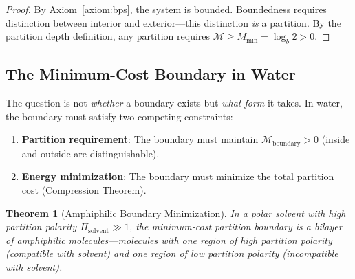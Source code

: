 \documentclass[twocolumn,10pt]{article}
\newtheorem{theorem}{Theorem}[section]
\theoremstyle{remark}
\newcommand{\Depth}{\mathcal{M}}
\newcommand{\Mmin}{M_{\mathrm{min}}}
\begin{document}
\begin{proof}
By Axiom~\ref{axiom:bps}, the system is bounded. Boundedness requires distinction between interior and exterior---this distinction \emph{is} a partition. By the partition depth definition, any partition requires $\Depth \geq \Mmin = \log_b 2 > 0$.
\end{proof}

\subsection{The Minimum-Cost Boundary in Water}

The question is not \emph{whether} a boundary exists but \emph{what form} it takes. In water, the boundary must satisfy two competing constraints:

\begin{enumerate}
    \item \textbf{Partition requirement}: The boundary must maintain $\Depth_{\text{boundary}} > 0$ (inside and outside are distinguishable).
    \item \textbf{Energy minimization}: The boundary must minimize the total partition cost (Compression Theorem).
\end{enumerate}

\begin{theorem}[Amphiphilic Boundary Minimization]
\label{thm:amphiphilic}
In a polar solvent with high partition polarity $\Pi_{\text{solvent}} \gg 1$, the minimum-cost partition boundary is a bilayer of amphiphilic molecules---molecules with one region of high partition polarity (compatible with solvent) and one region of low partition polarity (incompatible with solvent).
\end{theorem}
\end{document}
